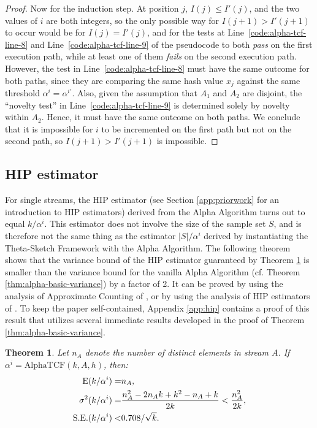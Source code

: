 \documentclass{article}
\newcommand{\ept}{\operatornamewithlimits{E}}
\newtheorem{theorem}{Theorem}[section]
\begin{document}
\begin{proof}
Now for the induction step. At position $j$, $I(j) \le I'(j)$, and the two values of $i$
are both integers, so the only possible way for $I(j+1) > I'(j+1)$ to occur would be for $I(j) = I'(j)$, and for the
tests at
Line~\ref{code:alpha-tcf-line-8}
and
Line~\ref{code:alpha-tcf-line-9} of the pseudocode to both {\em pass} on the first execution path, while at least one of them
{\em fails} on the second execution path. However, the test in Line~\ref{code:alpha-tcf-line-8} must have the same outcome for both paths,
since they are comparing the same hash value $x_j$ against the same threshold $\alpha^i = \alpha^{i'}$. Also, given the
assumption that $A_1$ and $A_2$ are disjoint, the ``novelty test'' in Line~\ref{code:alpha-tcf-line-9} is
determined solely by novelty within
$A_2$. Hence, it must have the same outcome on both paths. We conclude that it is impossible for $i$ to be incremented on the
first path but not on the second path, so $I(j+1) > I'(j+1)$ is impossible.
\end{proof}

\subsection{HIP estimator} 
\label{sec:hipsec} 
For single streams, the HIP estimator (see Section \ref{app:priorwork} for an introduction to HIP estimators) derived from the Alpha 
Algorithm turns out to equal $k/\alpha^i$.
This estimator does not involve the size of the sample set $S$, and is therefore not the same thing
as the estimator $|S|/\alpha^i$ derived by instantiating the Theta-Sketch Framework with 
the Alpha Algorithm.
The following theorem shows that the variance bound of the HIP estimator guaranteed by
Theorem \ref{thm:hip} is smaller than the variance bound for the
vanilla Alpha Algorithm (cf. Theorem \ref{thm:alpha-basic-variance}) by a
factor of 2. It 
can be proved by using the analysis of Approximate Counting
of \cite{morris1978counting,flajolet1985approximate},
or by using the analysis of HIP estimators of \cite{cohennew, ting}. To 
keep the paper self-contained, Appendix \ref{app:hip} contains
a proof of this result that utilizes several immediate results developed in the proof of
Theorem \ref{thm:alpha-basic-variance}.


\begin{theorem} \label{thm:hip} Let $n_A$ denote the number of distinct elements in stream $A$.
If $\alpha^i = \mathrm{AlphaTCF}(k,A,h)$, then: 
\begin{align*}
\ept(k/\alpha^i) = & n_A, \\
\sigma^2(k/\alpha^i) = & \frac{n_A^2-2n_Ak+k^2-n_A+k}{2k} < \frac{n_A^2}{2k}, \\
\mathrm{S.E.}(k/\alpha^i) < & 0.708 / \sqrt{k}.
\end{align*}
\end{theorem}
\end{document}
